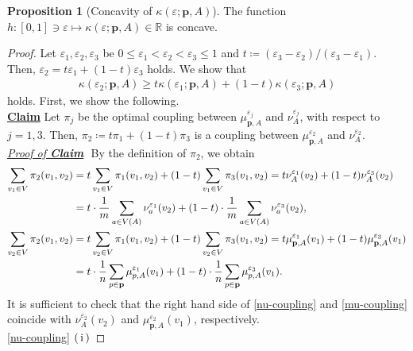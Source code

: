 \documentclass{article}
\numberwithin{equation}{section}
\theoremstyle{definition}
\newtheorem{proposition}[proposition]{Proposition}
\newcommand{\K}{\kappa}
\newcommand{\R}{\mathbb{R}}
\newcommand{\eps}{\varepsilon} %
\newcommand{\kepa}{\kappa(\eps;\mathbf{p},A)}
\def\:={\coloneqq} %
\begin{document}
\begin{proposition}[Concavity of $\kepa$] \label{kepa-concavity}
The function $h:[0,1]\ni\eps\mapsto\kepa\in\R$ is concave.
\end{proposition}

\begin{proof}
Let $\eps_1,\eps_2,\eps_3$ be $0\le\eps_1<\eps_2<\eps_3\le1$ and $t\:=(\eps_3-\eps_2)/(\eps_3-\eps_1)$.
Then, $\eps_2=t\eps_1+(1-t)\eps_3$ holds.
We show that 
\begin{align}
    \K(\eps_2;\mathbf{p},A) \ge t\K(\eps_1;\mathbf{p},A) + (1-t)\K(\eps_3;\mathbf{p},A) \label{ineq:kepa-concavity}
\end{align}
holds.
First, we show the following. \vspace{2mm} \\
\underline{\textbf{Claim}} 
Let $\pi_j$ be the optimal coupling between $\mu_{\mathbf{p},A}^{\eps_j}$ and $\nu_A^{\eps_j}$, with respect to $j=1,3$.
Then, $\pi_2\:=t\pi_1+(1-t)\pi_3$ is a coupling between $\mu_{\mathbf{p},A}^{\eps_2}$ and $\nu_A^{\eps_2}$.
\vspace{1mm} \\
\underline{\textit{Proof of \textbf{Claim}}}
$ $\newline
By the definition of $\pi_2$, we obtain 
\begin{align}
    \sum_{v_1\in V}\pi_2(v_1,v_2)
    &= t\sum_{v_1\in V}\pi_1(v_1,v_2) + (1-t)\sum_{v_1\in V}\pi_3(v_1,v_2)
    = t\nu_A^{\eps_1}(v_2) + (1-t)\nu_A^{\eps_3}(v_2) \notag \\
    &= t\cdot\frac{1}{m}\sum_{a\in V(A)}\nu_a^{\eps_1}(v_2) + (1-t)\cdot\frac{1}{m}\sum_{a\in V(A)}\nu_a^{\eps_3}(v_2) 
    \label{nu-coupling}, \\
    \sum_{v_2\in V}\pi_2(v_1,v_2)
    &= t\sum_{v_2\in V}\pi_1(v_1,v_2) + (1-t)\sum_{v_2\in V}\pi_3(v_1,v_2)
    = t\mu_{\mathbf{p},A}^{\eps_1}(v_1) + (1-t)\mu_{\mathbf{p},A}^{\eps_3}(v_1) \notag \\
    &= t\cdot\frac{1}{n}\sum_{p\in \mathbf{p}}\mu_{p,A}^{\eps_1}(v_1) + (1-t)\cdot\frac{1}{n}\sum_{p\in \mathbf{p}}\mu_{p,A}^{\eps_3}(v_1). \label{mu-coupling}
\end{align}
It is sufficient to check that the right hand side of \eqref{nu-coupling} and \eqref{mu-coupling} coincide with $\nu_A^{\eps_2}(v_2)$ and $\mu_{\mathbf{p},A}^{\eps_2}(v_1)$, respectively. \\
\underline{\eqref{nu-coupling}}
$\rm(\hspace{.18em}i\hspace{.18em})$ 

\end{proof}
\end{document}
